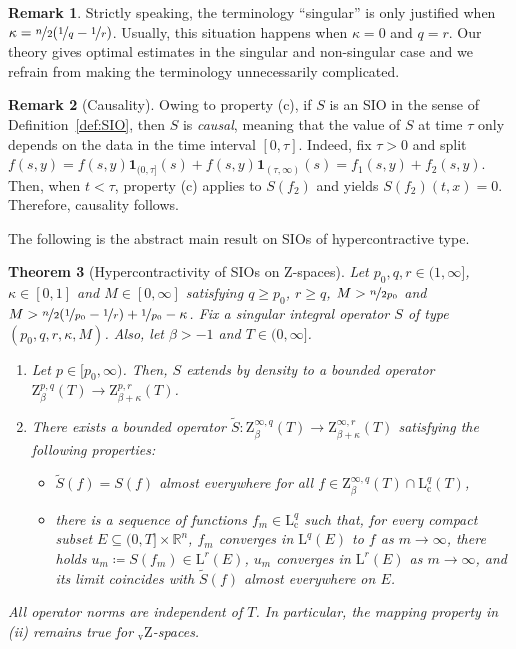 \documentclass[11pt, leqno]{amsart}
\newtheorem{theorem}{Theorem}[section]
\theoremstyle{definition}
\newtheorem{remark}[theorem]{Remark}
\newcommand{\R}{\mathbb{R}}
\renewcommand{\L}{\mathrm{L}}
\newcommand{\Z}{\mathrm{Z}}
\newcommand{\Zv}{{}_\mathrm{v}\mathrm{Z}}
\newcommand{\cc}{\mathrm{c}}
\newcommand{\ind}{\mathbf{1}}
\begin{document}
	\begin{remark}
		Strictly speaking, the terminology \enquote{singular} is only justified when $\kappa = \nicefrac{n}{2}(\nicefrac{1}{q} - \nicefrac{1}{r})$. Usually, this situation happens when $\kappa = 0$ and $q = r$. Our theory gives optimal estimates in the singular and non-singular case and we refrain from making the terminology unnecessarily complicated.
	\end{remark}

	\begin{remark}[Causality]
		\label{rem:SIO_causal}
		Owing to property (c), if $S$ is an SIO in the sense of Definition~\ref{def:SIO}, then $S$ is \emph{causal}, meaning that the value of $S$ at time $\tau$ only depends on the data in the time interval $[0,\tau]$. Indeed, fix $\tau > 0$ and split $f(s,y) = f(s,y)\ind_{(0,\tau]}(s) + f(s,y)\ind_{(\tau,\infty)}(s)=f_{1}(s,y)+f_{2}(s,y)$. Then, when $t < \tau$, property (c) applies to $S(f_2)$ and yields $S(f_2)(t,x) = 0$. Therefore, causality follows.
	\end{remark}

	The following is the abstract main result on SIOs of hypercontractive type.

	\begin{theorem}[Hypercontractivity of SIOs on $\Z$-spaces]
		\label{thm:sio}
		Let $p_0,q,r \in (1,\infty]$, $\kappa \in [0,1]$ and $M \in [0,\infty]$ satisfying $q \geq p_0$, $r \geq q$, $M > \nicefrac{n}{2p_0}$ and $M > \nicefrac{n}{2}(\nicefrac{1}{p_0} - \nicefrac{1}{r}) + \nicefrac{1}{p_0} - \kappa$. Fix a singular integral operator $S$ of type $(p_0,q,r,\kappa,M)$. Also, let $\beta > -1$ and $T \in (0,\infty]$.
		\begin{enumerate}
			\item[(i)] Let $p \in [p_0, \infty)$. Then, $S$ extends by density to a bounded operator $\Z^{p,q}_\beta(T) \to \Z^{p,r}_{\beta + \kappa}(T)$.
			\item[(ii)] There exists a bounded operator $\widetilde{S} \colon \Z^{\infty,q}_\beta(T) \to \Z^{\infty,r}_{\beta + \kappa}(T)$ satisfying the following properties:
			\begin{itemize}
				\item $\widetilde{S}(f) = S(f)$ almost everywhere for all $f \in \Z^{\infty,q}_\beta(T) \cap \L^q_\cc(T)$,
				\item there is a sequence of functions $f_m \in \L^q_\cc$ such that, for every compact subset $E \subseteq (0,T] \times \R^n$, $f_m$ converges in $\L^q(E)$ to $f$ as $m\to \infty$, there holds $u_m \coloneqq S(f_m) \in \L^r(E)$, $u_m$ converges in $\L^r(E)$ as $m\to \infty$, and its limit coincides with $\widetilde{S}(f)$ almost everywhere on $E$.
			\end{itemize}
		\end{enumerate}
		All operator norms are independent of $T$.
		In particular, the mapping property in (ii) remains true for $\Zv$-spaces.
	\end{theorem}
\end{document}
